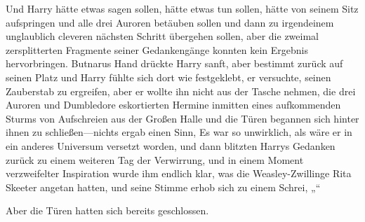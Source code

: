 Und Harry hätte etwas sagen sollen, hätte etwas tun sollen, hätte von seinem Sitz aufspringen und alle drei Auroren betäuben sollen und dann zu irgendeinem unglaublich cleveren nächsten Schritt übergehen sollen, aber die zweimal zersplitterten Fragmente seiner Gedankengänge konnten kein Ergebnis hervorbringen.
Butnarus Hand drückte Harry sanft, aber bestimmt zurück auf seinen Platz und Harry fühlte sich dort wie festgeklebt, er versuchte, seinen Zauberstab zu ergreifen, aber er wollte ihn nicht aus der Tasche nehmen, die drei Auroren und Dumbledore eskortierten Hermine inmitten eines aufkommenden Sturms von Aufschreien aus der Großen Halle und die Türen begannen sich hinter ihnen zu schließen—nichts ergab einen Sinn, Es war so unwirklich, als wäre er in ein anderes Universum versetzt worden, und dann blitzten Harrys Gedanken zurück zu einem weiteren Tag der Verwirrung, und in einem Moment verzweifelter Inspiration wurde ihm endlich klar, was die Weasley-Zwillinge Rita Skeeter angetan hatten, und seine Stimme erhob sich zu einem Schrei,
„“

Aber die Türen hatten sich bereits geschlossen.

\later

